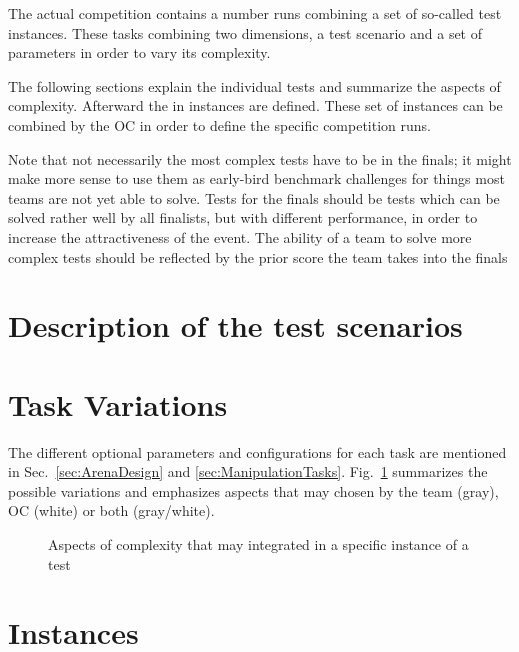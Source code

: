 
The actual competition contains a number runs combining a set of so-called
test instances. These tasks combining two dimensions, a test scenario and a
set of parameters in order to vary its complexity.

The following sections explain the individual tests and summarize the aspects of
complexity. Afterward the in instances are defined. These set of instances can
be combined by the OC in order to define the specific competition runs.

Note that not necessarily the most complex tests have to be in the finals;
it might make more sense to use them as early-bird benchmark challenges for
things most teams are not yet able to solve. Tests for the finals should be
tests which can be solved rather well by all finalists, but with different
performance, in order to increase the attractiveness of the event. The ability
of a team to solve more complex tests should be reflected by the prior score
the team takes into the finals

\section{Description of the test scenarios}











\section{Task Variations}

The different optional parameters and configurations for each task are 
mentioned in Sec.~\ref{sec:ArenaDesign} and \ref{sec:ManipulationTasks}. 
Fig.~\ref{fig:complexityTree} summarizes the possible variations and 
emphasizes aspects that may chosen by the team (gray), OC (white) or both 
(gray/white).

\begin{figure}[ht]
\centering

\caption{Aspects of complexity that may integrated in a specific instance of a test}
\label{fig:complexityTree}
\end{figure}


\section{Instances}

